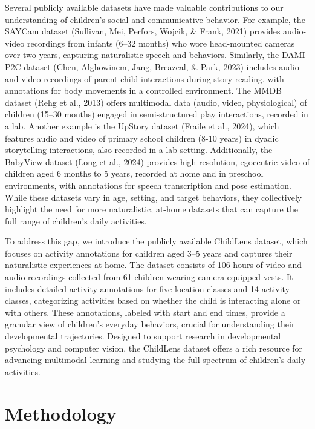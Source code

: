 \documentclass[
  man,floatsintext]{apa6}
\begin{document}
Several publicly available datasets have made valuable contributions to our understanding of children's social and communicative behavior. For example, the SAYCam dataset (Sullivan, Mei, Perfors, Wojcik, \& Frank, 2021) provides audio-video recordings from infants (6--32 months) who wore head-mounted cameras over two years, capturing naturalistic speech and behaviors. Similarly, the DAMI-P2C dataset (Chen, Alghowinem, Jang, Breazeal, \& Park, 2023) includes audio and video recordings of parent-child interactions during story reading, with annotations for body movements in a controlled environment. The MMDB dataset (Rehg et al., 2013) offers multimodal data (audio, video, physiological) of children (15--30 months) engaged in semi-structured play interactions, recorded in a lab. Another example is the UpStory dataset (Fraile et al., 2024), which features audio and video of primary school children (8-10 years) in dyadic storytelling interactions, also recorded in a lab setting. Additionally, the BabyView dataset (Long et al., 2024) provides high-resolution, egocentric video of children aged 6 months to 5 years, recorded at home and in preschool environments, with annotations for speech transcription and pose estimation. While these datasets vary in age, setting, and target behaviors, they collectively highlight the need for more naturalistic, at-home datasets that can capture the full range of children's daily activities.

To address this gap, we introduce the publicly available ChildLens dataset, which focuses on activity annotations for children aged 3--5 years and captures their naturalistic experiences at home. The dataset consists of 106 hours of video and audio recordings collected from 61 children wearing camera-equipped vests. It includes detailed activity annotations for five location classes and 14 activity classes, categorizing activities based on whether the child is interacting alone or with others. These annotations, labeled with start and end times, provide a granular view of children's everyday behaviors, crucial for understanding their developmental trajectories. Designed to support research in developmental psychology and computer vision, the ChildLens dataset offers a rich resource for advancing multimodal learning and studying the full spectrum of children's daily activities.

\section{Methodology}\label{methodology}
\end{document}
